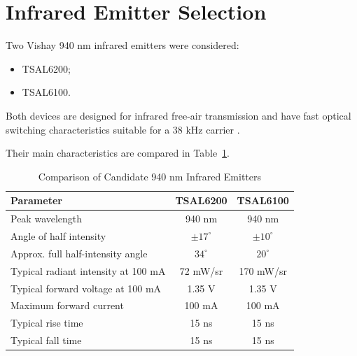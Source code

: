 \documentclass[a4paper,12pt]{article}
\begin{document}

\section{Infrared Emitter Selection}

Two Vishay 940 nm infrared emitters were considered:

\begin{itemize}
    \item TSAL6200;
    \item TSAL6100.
\end{itemize}

Both devices are designed for infrared free-air transmission and have
fast optical switching characteristics suitable for a 38 kHz carrier
\cite{tsal6200,tsal6100}.

Their main characteristics are compared in
Table~\ref{tab:led_comparison}.

\begin{table}[H]
    \centering
    \caption{Comparison of Candidate 940 nm Infrared Emitters}
    \label{tab:led_comparison}

    \begin{tabular}{@{}lcc@{}}
        \toprule

        \textbf{Parameter} &
        \textbf{TSAL6200} &
        \textbf{TSAL6100} \\

        \midrule

        Peak wavelength &
        940 nm &
        940 nm \\

        Angle of half intensity &
        \(\pm17^\circ\) &
        \(\pm10^\circ\) \\

        Approx. full half-intensity angle &
        \(34^\circ\) &
        \(20^\circ\) \\

        Typical radiant intensity at 100 mA &
        72 mW/sr &
        170 mW/sr \\

        Typical forward voltage at 100 mA &
        1.35 V &
        1.35 V \\

        Maximum forward current &
        100 mA &
        100 mA \\

        Typical rise time &
        15 ns &
        15 ns \\

        Typical fall time &
        15 ns &
        15 ns \\

        \bottomrule
    \end{tabular}

\end{table}
\end{document}
